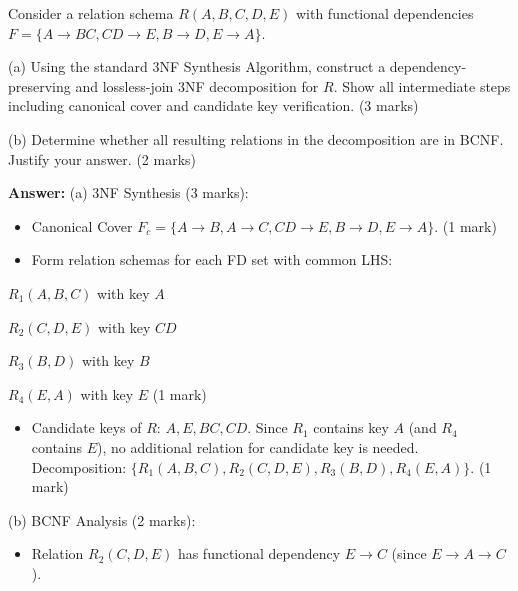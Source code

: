 \begin{tcolorbox}[enhanced,breakable,colback=boxgray,colframe=gray!45,boxrule=0.4pt,arc=2pt,left=6pt,right=6pt,top=4pt,bottom=4pt,title={Q.8},fonttitle=\bfseries\small,coltitle=black,colbacktitle=gray!15]
\small Consider a relation schema $R(A, B, C, D, E)$ with functional dependencies $F = \{ A \rightarrow BC, CD \rightarrow E, B \rightarrow D, E \rightarrow A \}$.\par
(a) Using the standard 3NF Synthesis Algorithm, construct a dependency-preserving and lossless-join 3NF decomposition for $R$. Show all intermediate steps including canonical cover and candidate key verification. (3 marks)\par
(b) Determine whether all resulting relations in the decomposition are in BCNF. Justify your answer. (2 marks)\par\par{}\par\smallskip\textbf{Answer:} (a) 3NF Synthesis (3 marks):\par
\begin{itemize}[leftmargin=1.4em,itemsep=1pt]
\item Canonical Cover $F_c = \{ A \rightarrow B, A \rightarrow C, CD \rightarrow E, B \rightarrow D, E \rightarrow A \}$. (1 mark)
\item Form relation schemas for each FD set with common LHS:
\end{itemize}
$R_1(A, B, C)$ with key $A$\par
$R_2(C, D, E)$ with key $CD$\par
$R_3(B, D)$ with key $B$\par
$R_4(E, A)$ with key $E$ (1 mark)\par
\begin{itemize}[leftmargin=1.4em,itemsep=1pt]
\item Candidate keys of $R$: $A, E, BC, CD$. Since $R_1$ contains key $A$ (and $R_4$ contains $E$), no additional relation for candidate key is needed. Decomposition: $\{R_1(A,B,C), R_2(C,D,E), R_3(B,D), R_4(E,A)\}$. (1 mark)
\end{itemize}
(b) BCNF Analysis (2 marks):\par
\begin{itemize}[leftmargin=1.4em,itemsep=1pt]
\item Relation $R_2(C, D, E)$ has functional dependency $E \rightarrow C$ (since $E \rightarrow A \rightarrow C$).

\end{itemize}
\end{tcolorbox}

